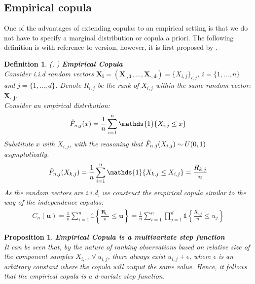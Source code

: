 \documentclass[12pt]{report}
\newtheorem{proposition}{Proposition}[section]
\newtheorem{definition}{Definition}[subsection]
\newcommand{\1}{\mathbf{1}}
\begin{document}
\begin{flushleft}
\newpage
\subsection{Empirical copula}
\vspace{0.5cm}
One of the advantages of extending copulas to an empirical setting is that we do not have to specify a marginal distribution or copula a priori. The following definition is with reference to \cite{SegersEBC} version, however, it is first proposed by \cite{DeheuvelsEC}.

\begin{definition}\label{ECDef}
\textit{(\normalfont\cite{DeheuvelsEC}, \normalfont\cite{SegersEBC})}
\:\textbf{Empirical Copula} \\
Consider i.i.d random vectors $\boldsymbol{X_{i}} = (\boldsymbol{X_{\cdot,1}}, \dots, \boldsymbol{X_{\cdot,d}}) = \{ X_{i,j} \}_{i,j}$, $i = \{1, \dots, n \}$ and $j = \{1, \dots, d \}$. Denote $R_{i,j}$ be the rank of $X_{i,j}$ within the same random vector: $\boldsymbol{X_{\cdot ,j}}$.\\
Consider an empirical distribution:
\begin{align*}
\Hat{F}_{n,j}(x) = \frac{1}{n} \sum\limits_{i = 1}^{n} \mathds{1}\{X_{i,j} \le x\}
\end{align*}
Substitute $x$ with $X_{i,j}$, with the reasoning that $\Hat{F}_{n,j}(X_{i,j}) \sim U(0,1)$ asymptotically.
\begin{align*}
\Hat{F}_{n,j}(X_{k,j}) = \frac{1}{n} \sum\limits_{i = 1}^{n} \mathds{1}\{X_{k,j} \le X_{i,j}\} = \frac{R_{k,j}}{n}
\end{align*}
As the random vectors are i.i.d, we construct the empirical copula similar to the way of the independence copulas:
\begin{align*}
C_{n}(\textbf{u}) = \frac{1}{n} \sum\limits_{i = 1}^{n} \mathds{1}\left\{ \frac{\boldsymbol{R_{i,\cdot}}}{n} \le \textbf{u} \right\} = \frac{1}{n} \sum\limits_{i = 1}^{n} \prod\limits_{j = 1}^{d} \mathds{1}\left\{ \frac{R_{i,j}}{n} \le u_{j} \right\}
\end{align*}
\end{definition}
\vspace{0.5cm}
\begin{proposition}\label{ECisStepFunction}
\textbf{Empirical Copula is a multivariate step function} \\
It can be seen that, by the nature of ranking observations based on relative size of the component samples $X_{i,\cdot}$, $\forall \: u_{i,j}$, there always exist $u_{i,j} + \epsilon$, where $\epsilon$ is an arbitrary constant where the copula will output the same value. Hence, it follows that the empirical copula is a d-variate step function.  
\end{proposition}


\end{flushleft}
\end{document}
